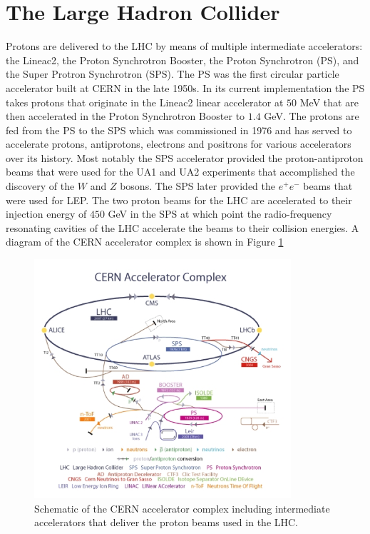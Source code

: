 \section{The Large Hadron Collider}
\label{sec:lhc}
Protons are delivered to the LHC by means of multiple intermediate accelerators: the Lineac2, the Proton Synchrotron Booster, the Proton Synchrotron (PS), and the Super Protron Synchrotron (SPS).
The PS was the first circular particle accelerator built at CERN in the late 1950s. 
In its current implementation the PS takes protons that originate in the Lineac2 linear accelerator at $50$ MeV that are then accelerated in the Proton Synchrotron Booster to $1.4$ GeV.
The protons are fed from the PS to the SPS which was commissioned in 1976 and has served to accelerate protons, antiprotons, electrons and positrons for various accelerators over its history.
Most notably the SPS accelerator provided the proton-antiproton beams that were used for the UA1 and UA2 experiments that accomplished the discovery of the $W$ and $Z$ bosons.
The SPS later provided the $e^{+}e^{-}$ beams that were used for LEP.
The two proton beams for the LHC are accelerated to their injection energy of $450$ GeV in the SPS at which point the radio-frequency resonating cavities of the LHC accelerate the beams to their collision energies.
A diagram of the CERN accelerator complex is shown in Figure \ref{fig:lhc}
\begin{figure}[htpb]
\begin{center}
\includegraphics[width=0.85\textwidth]{plots/lhc.png}
\caption{Schematic of the CERN accelerator complex including intermediate accelerators that deliver the proton beams used in the LHC.}
\label{fig:lhc}
\end{center}
\end{figure}

